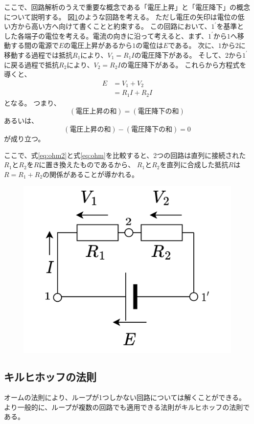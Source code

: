 \documentclass{ltjsreport}
\begin{document}
ここで、回路解析のうえで重要な概念である「電圧上昇」と「電圧降下」の概念について説明する。
図\ref{fig:voltup_down}のような回路を考える。
ただし電圧の矢印は電位の低い方から高い方へ向けて書くことと約束する。
この回路において、$1^\prime$を基準とした各端子の電位を考える。電流の向きに沿って考えると、まず、$1^\prime$から$1$へ移動する間の電源で$E$の電圧上昇があるから$1$の電位は$E$である。
次に、$1$から$2$に移動する過程では抵抗$R_1$により、$V_1=R_1I$の電圧降下がある。
そして、$2$から$1^\prime$に戻る過程で抵抗$R_2$により、$V_2=R_2I$の電圧降下がある。
これらから方程式を導くと、
\begin{align} 
  E &= V_1+V_2\\ \label{eq:ohm2}
    &= R_1I +R_2I
\end{align}
となる。
つまり、
\[
  (電圧上昇の和) = (電圧降下の和)
\]
あるいは、
\[
  (電圧上昇の和)-(電圧降下の和) =0
\]
が成り立つ。

ここで、式\eqref{eq:ohm2}と式\eqref{eq:ohm}を比較すると、2つの回路は直列に接続された$R_1$と$R_2$を$R$に置き換えたものであるから、
$R_1$と$R_2$を直列に合成した抵抗$R$は$R=R_1+R_2$の関係があることが導かれる。


\begin{figure}[tb]
  \centering
  \includegraphics[keepaspectratio, scale=0.07]
       {img/ohm2.drawio.png}
  \caption{}
  \label{fig:voltup_down}
 \end{figure}


\subsection{キルヒホッフの法則}
オームの法則により、ループが1つしかない回路については解くことができる。
より一般的に、ループが複数の回路でも適用できる法則がキルヒホッフの法則である。
\end{document}
